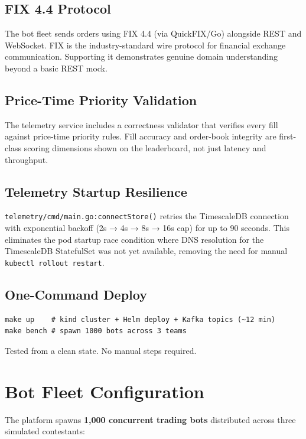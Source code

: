 \documentclass[12pt,a4paper]{article}
\begin{document}
\subsection{FIX 4.4 Protocol}
The bot fleet sends orders using FIX 4.4 (via QuickFIX/Go) alongside REST and WebSocket. FIX is the industry-standard wire protocol for financial exchange communication. Supporting it demonstrates genuine domain understanding beyond a basic REST mock.

\subsection{Price-Time Priority Validation}
The telemetry service includes a correctness validator that verifies every fill against price-time priority rules. Fill accuracy and order-book integrity are first-class scoring dimensions shown on the leaderboard, not just latency and throughput.

\subsection{Telemetry Startup Resilience}
\texttt{telemetry/cmd/main.go:connectStore()} retries the TimescaleDB connection with exponential backoff (2s → 4s → 8s → 16s cap) for up to 90 seconds. This eliminates the pod startup race condition where DNS resolution for the TimescaleDB StatefulSet was not yet available, removing the need for manual \texttt{kubectl rollout restart}.

\subsection{One-Command Deploy}
\begin{lstlisting}
make up    # kind cluster + Helm deploy + Kafka topics (~12 min)
make bench # spawn 1000 bots across 3 teams
\end{lstlisting}
Tested from a clean state. No manual steps required.

\section{Bot Fleet Configuration}

The platform spawns \textbf{1,000 concurrent trading bots} distributed across three simulated contestants:
\end{document}
